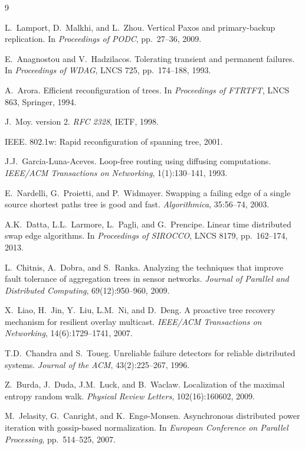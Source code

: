 \documentclass{article}
\begin{document}

\begin{thebibliography}{9}

L.~Lamport, D.~Malkhi, and L.~Zhou.
\newblock Vertical Paxos and primary-backup replication.
\newblock In \emph{Proceedings of PODC}, pp.~27--36, 2009.

E.~Anagnostou and V.~Hadzilacos.
\newblock Tolerating transient and permanent failures.
\newblock In \emph{Proceedings of WDAG}, LNCS 725, pp.~174--188, 1993.

A.~Arora.
\newblock Efficient reconfiguration of trees.
\newblock In \emph{Proceedings of FTRTFT}, LNCS 863, Springer, 1994.

J.~Moy.
 version 2.
\newblock \emph{RFC 2328}, IETF, 1998.

{IEEE}.
 802.1w: Rapid reconfiguration of spanning tree, 2001.

J.J.~Garcia-Luna-Aceves.
\newblock Loop-free routing using diffusing computations.
\newblock \emph{IEEE/ACM Transactions on Networking}, 1(1):130--141, 1993.

E.~Nardelli, G.~Proietti, and P.~Widmayer.
\newblock Swapping a failing edge of a single source shortest paths tree is good and fast.
\newblock \emph{Algorithmica}, 35:56--74, 2003.

A.K.~Datta, L.L.~Larmore, L.~Pagli, and G.~Prencipe.
\newblock Linear time distributed swap edge algorithms.
\newblock In \emph{Proceedings of SIROCCO}, LNCS 8179, pp.~162--174, 2013.

L.~Chitnis, A.~Dobra, and S.~Ranka.
\newblock Analyzing the techniques that improve fault tolerance of aggregation trees in sensor networks.
\newblock \emph{Journal of Parallel and Distributed Computing}, 69(12):950--960, 2009.

X.~Liao, H.~Jin, Y.~Liu, L.M.~Ni, and D.~Deng.
\newblock A proactive tree recovery mechanism for resilient overlay multicast.
\newblock \emph{IEEE/ACM Transactions on Networking}, 14(6):1729--1741, 2007.

T.D.~Chandra and S.~Toueg.
\newblock Unreliable failure detectors for reliable distributed systems.
\newblock \emph{Journal of the ACM}, 43(2):225--267, 1996.

Z.~Burda, J.~Duda, J.M.~Luck, and B.~Waclaw.
\newblock Localization of the maximal entropy random walk.
\newblock \emph{Physical Review Letters}, 102(16):160602, 2009.

M.~Jelasity, G.~Canright, and K.~Eng\o-Monsen.
\newblock Asynchronous distributed power iteration with gossip-based normalization.
\newblock In \emph{European Conference on Parallel Processing}, pp.~514--525, 2007.

\end{thebibliography}
\end{document}
